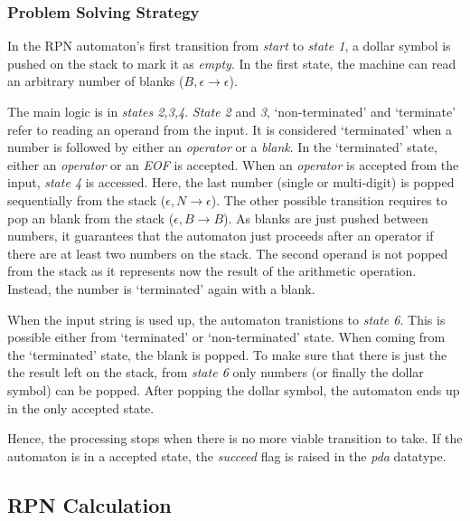 \documentclass[a4paper,11pt,twoside]{article}
\begin{document}
\subsubsection{Problem Solving Strategy}
In the RPN automaton's first transition from \textit{start} to \textit{state
1}, a dollar symbol is pushed on the stack to mark it as
\textit{empty}. In the first state, the machine can read an arbitrary
number of blanks ($B,\epsilon \rightarrow \epsilon$).

The main logic is in \textit{states 2,3,4}. \textit{State 2} and
\textit{3}, `non-terminated' and `terminate' refer to reading an
operand from the input. It is considered `terminated' when a
number is followed by either an \textit{operator} or a
\textit{blank}. In the `terminated' state, either an \textit{operator}
or an \textit{EOF} is accepted. When an \textit{operator} is accepted
from the input, \textit{state 4} is accessed. Here, the last number
(single or multi-digit) is popped sequentially from the stack
($\epsilon,N \rightarrow \epsilon$). The other possible transition
requires to pop an blank from the stack ($\epsilon, B \rightarrow
B$). As blanks are just pushed between numbers, it guarantees that the
automaton just proceeds after an operator if there are at least two
numbers on the stack. The second operand is not popped from the stack
as it represents now the result of the arithmetic operation. Instead,
the number is `terminated' again with a blank.  

When the input string is used up, the automaton tranistions to
\textit{state 6}. This is possible either from `terminated' or
`non-terminated' state. When coming from the `terminated' state, the
blank is popped. To make sure that there is just the the result left
on the stack, from \textit{state 6} only numbers (or finally the
dollar symbol) can be popped. After popping the dollar symbol, the
automaton ends up in the only accepted state.

Hence, the processing stops when there is no more viable transition to
take. If the automaton is in a accepted state, the \textit{succeed}
flag is raised in the \textit{pda} datatype. 

\subsection{RPN Calculation}
\end{document}
